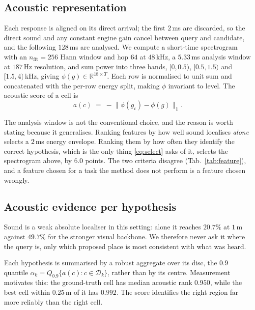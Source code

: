 \subsection{Acoustic representation}
\label{sec:acoustic}

Each response is aligned on its direct arrival; the first $2$\,ms are discarded,
so the direct sound and any constant engine gain cancel between query and
candidate, and the following $128$\,ms are analysed. We compute a short-time
spectrogram with an $n_{\mathrm{fft}}{=}256$ Hann window and hop $64$ at
$48$\,kHz, a $5.33$\,ms analysis window at $187$\,Hz resolution, and sum power
into three bands, $[0,0.5)$, $[0.5,1.5)$ and $[1.5,4)$\,kHz, giving
$\phi(g) \in \mathbb{R}^{18 \times T}$. Each row is normalised to unit sum and
concatenated with the per-row energy split, making $\phi$ invariant to level.
The acoustic score of a cell is
%
\begin{equation}
  a(c) \;=\; -\big\| \phi(g_c) - \phi(g) \big\|_1 .
  \label{eq:score}
\end{equation}

The analysis window is not the conventional choice, and the reason is worth
stating because it generalises. Ranking features by how well sound localises
\emph{alone} selects a $2$\,ms energy envelope. Ranking them by how often they
identify the correct hypothesis, which is the only thing \eqref{eq:select}
asks of it, selects the spectrogram above, by $6.0$ points. The two criteria disagree
(Tab.~\ref{tab:feature}), and a feature chosen for a task the method does not
perform is a feature chosen wrongly.

\subsection{Acoustic evidence per hypothesis}
\label{sec:evidence}

Sound is a weak absolute localiser in this setting: alone it reaches $20.7\%$ at
$1$\,m against $49.7\%$ for the stronger visual backbone. We therefore never ask
it where the query is, only which proposed place is most consistent with what
was heard.

Each hypothesis is summarised by a robust aggregate over its disc, the $0.9$
quantile $\alpha_k = Q_{0.9}\{a(c) : c \in \mathcal{D}_k\}$, rather than by its
centre. Measurement motivates this: the ground-truth cell has median acoustic
rank $0.950$, while the best cell within $0.25$\,m of it has $0.992$. The score
identifies the right region far more reliably than the right cell.

